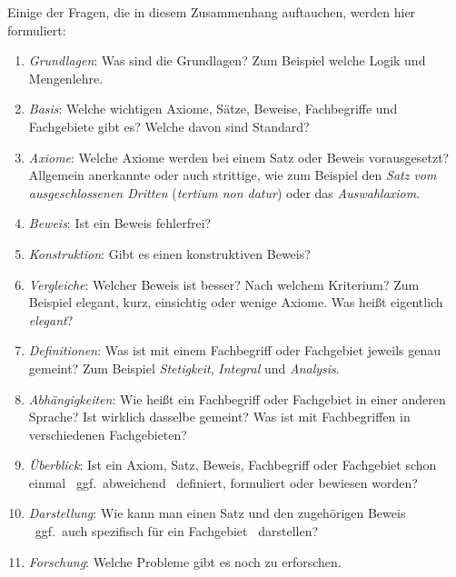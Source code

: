 \documentclass[english,ngerman,parskip=half,headsepline,footsepline]{scrreprt}
\makeatletter
\newcommand*{\textggf}{ggf.\@}
\makeatother
\begin{document}
	Einige der Fragen, die in diesem Zusammenhang auftauchen, werden hier formuliert:

	\begin{enumerate}

		\item \label{Frage:Grundlagen} \emph{Grundlagen}: Was sind die Grundlagen? Zum Beispiel welche Logik und Mengenlehre.

		\item \label{Frage:Basis} \emph{Basis}: Welche wichtigen Axiome, Sätze, Beweise, Fachbegriffe und Fachgebiete gibt es? Welche davon sind Standard?

		\item \label{Frage:Axiome} \emph{Axiome}: Welche Axiome werden bei einem Satz oder Beweis vorausgesetzt? Allgemein anerkannte oder auch strittige, wie zum Beispiel den \emph{Satz vom ausgeschlossenen Dritten} (\emph{tertium non datur}) oder das \emph{Auswahlaxiom}.

		\item \label{Frage:Beweis} \emph{Beweis}: Ist ein Beweis fehlerfrei?

		\item \label{Frage:Konstruktion} \emph{Konstruktion}: Gibt es einen konstruktiven Beweis?

		\item \label{Frage:Vergleiche} \emph{Vergleiche}: Welcher Beweis ist besser? Nach welchem Kriterium? Zum Beispiel elegant, kurz, einsichtig oder wenige Axiome. Was heißt eigentlich \emph{elegant}?

		\item \label{Frage:Definitionen} \emph{Definitionen}: Was ist mit einem Fachbegriff oder Fachgebiet jeweils genau gemeint? Zum Beispiel \emph{Stetigkeit}, \emph{Integral} und \emph{Analysis}.

		\item \label{Frage:Abhängigkeiten} \emph{Abhängigkeiten}: Wie heißt ein Fachbegriff oder Fachgebiet in einer anderen Sprache? Ist wirklich dasselbe gemeint? Was ist mit Fachbegriffen in verschiedenen Fachgebieten?

		\item \label{Frage:Überblick} \emph{Überblick}: Ist ein Axiom, Satz, Beweis, Fachbegriff oder Fachgebiet schon einmal \textendash\ \textggf\ abweichend \textendash\ definiert, formuliert oder bewiesen worden?

		\item \label{Frage:Darstellung} \emph{Darstellung}: Wie kann man einen Satz und den zugehörigen Beweis \textendash\ \textggf\ auch spezifisch für ein Fachgebiet \textendash\ darstellen?

		\item \label{Frage:Forschung} \emph{Forschung}: Welche Probleme gibt es noch zu erforschen.

	\end{enumerate}
\end{document}
